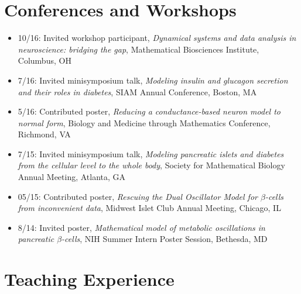 \documentclass[11pt]{article}
\begin{document}
\section*{Conferences and Workshops}
\label{sec:orgheadline11}
\begin{itemize}
\item 10/16: Invited workshop participant, \emph{Dynamical systems and data analysis in neuroscience: bridging the gap}, Mathematical Biosciences Institute, Columbus, OH\\
\item 7/16: Invited minisymposium talk, \emph{Modeling insulin and glucagon secretion and their roles in diabetes}, SIAM Annual Conference, Boston, MA\\
\item 5/16: Contributed poster, \emph{Reducing a conductance-based neuron model to normal form}, Biology and Medicine through Mathematics Conference, Richmond, VA\\
\item 7/15: Invited minisymposium talk, \emph{Modeling pancreatic islets and diabetes from the cellular level to the whole body}, Society for Mathematical Biology Annual Meeting, Atlanta, GA\\
\item 05/15: Contributed poster, \emph{Rescuing the Dual Oscillator Model for \(\beta\)-cells from inconvenient data}, Midwest Islet Club Annual Meeting, Chicago, IL\\
\item 8/14: Invited poster, \emph{Mathematical model of metabolic oscillations in pancreatic \(\beta\)-cells}, NIH Summer Intern Poster Session, Bethesda, MD\\
\end{itemize}
\section*{Teaching Experience}
\label{sec:orgheadline16}
\end{document}
